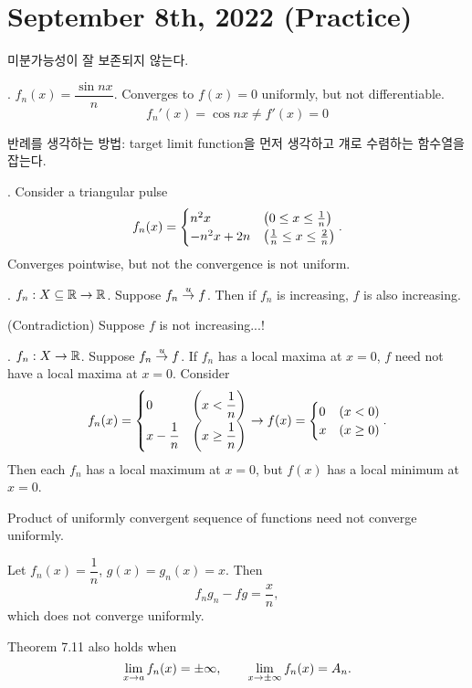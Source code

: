 \section*{September 8th, 2022 (Practice)}

미분가능성이 잘 보존되지 않는다.

\ex. \(f_n(x) = \dfrac{\sin nx}{n}\). Converges to \(f(x) = 0\) uniformly, but not differentiable.
\[
    f_n'(x) = \cos nx \neq f'(x) = 0
\]

반례를 생각하는 방법: target limit function을 먼저 생각하고 걔로 수렴하는 함수열을 잡는다.

\ex. Consider a triangular pulse
\[
    f_n(x) = \begin{cases}
        n^2 x       & \left( 0 \leq x \leq \frac{1}{n} \right)           \\
        -n^2 x + 2n & \left( \frac{1}{n} \leq x \leq \frac{2}{n} \right)
    \end{cases}.
\]
Converges pointwise, but not the convergence is not uniform.

\ex. \(f_n: X\subseteq \mathbb{R} \rightarrow \mathbb{R}\). Suppose \(f_n \overset{u}{\rightarrow} f\). Then if \(f_n\) is increasing, \(f\) is also increasing.

\pf (Contradiction) Suppose \(f\) is not increasing...!

\ex. \(f_n: X \rightarrow \mathbb{R}\). Suppose \(f_n \overset{u}{\rightarrow} f\). If \(f_n\) has a local maxima at \(x = 0\), \(f\) need not have a local maxima at \(x = 0\). Consider
\[
    f_n(x) = \begin{cases}
        0               & \left( x < \dfrac{1}{n} \right)    \\
        x - \dfrac{1}{n} & \left( x \geq \dfrac{1}{n} \right)
    \end{cases} \rightarrow f(x) = \begin{cases}
        0 & \left( x < 0 \right) \\
        x & \left( x \geq 0 \right)
    \end{cases}.
\]
Then each \(f_n\) has a local maximum at \(x = 0\), but \(f(x)\) has a local minimum at \(x = 0\).

 Product of uniformly convergent sequence of functions need not converge uniformly.

\pf Let \(f_n(x) = \dfrac{1}{n}\), \(g(x) = g_n(x) = x\). Then
\[
    f_n g_n - fg = \frac{x}{n},
\]
which does not converge uniformly.

  Theorem 7.11 also holds when
\[
    \lim_{x \rightarrow a} f_n(x) = \pm \infty, \qquad \lim_{x \rightarrow \pm \infty} f_n(x) = A_n.
\]

